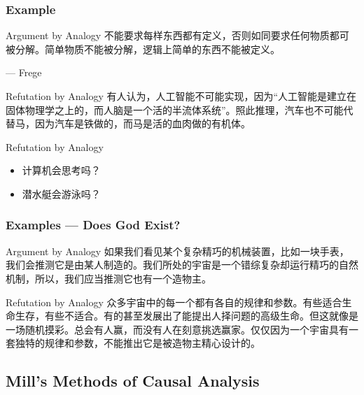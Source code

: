\documentclass[UTF8,11pt,colorlinks,compress,openany]{beamer}%
\begin{document}
\begin{frame}\frametitle{Example}
	\begin{block}{Argument by Analogy}
		不能要求每样东西都有定义，否则如同要求任何物质都可被分解。简单物质不能被分解，逻辑上简单的东西不能被定义。\par \hfill --- Frege
	\end{block}
	\begin{block}{Refutation by Analogy}
		有人认为，人工智能不可能实现，因为“人工智能是建立在固体物理学之上的，而人脑是一个活的半流体系统”。照此推理，汽车也不可能代替马，因为汽车是铁做的，而马是活的血肉做的有机体。
	\end{block}
	\begin{block}{Refutation by Analogy}
		\begin{itemize}
			\item 计算机会思考吗？
			\item 潜水艇会游泳吗？
		\end{itemize}
	\end{block}
\end{frame}

\begin{frame}\frametitle{Examples --- Does God Exist?}
	\begin{block}{Argument by Analogy}
		如果我们看见某个复杂精巧的机械装置，比如一块手表，我们会推测它是由某人制造的。我们所处的宇宙是一个错综复杂却运行精巧的自然机制，所以，我们应当推测它也有一个造物主。
	\end{block}
	\begin{block}{Refutation by Analogy}
		众多宇宙中的每一个都有各自的规律和参数。有些适合生命生存，有些不适合。有的甚至发展出了能提出人择问题的高级生命。但这就像是一场随机摸彩。总会有人赢，而没有人在刻意挑选赢家。仅仅因为一个宇宙具有一套独特的规律和参数，不能推出它是被造物主精心设计的。
	\end{block}
\end{frame}

\subsection{Mill's Methods of Causal Analysis}
\end{document}
